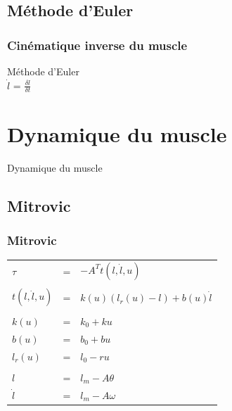 \documentclass{beamer}
\begin{document}
\subsection{Méthode d'Euler}

\begin{frame}
\frametitle{Cinématique inverse du muscle}
Méthode d'Euler\\
$\dot{l}$ = $\frac{\delta l}{\delta t}$ \\
\end{frame}
    

\section{Dynamique du muscle}
\begin{frame}
\begin{center}
{\LARGE Dynamique du muscle}
\end{center}
\end{frame}

\subsection{Mitrovic}

\begin{frame}
\frametitle{Mitrovic}
\begin{tabular}{lcl}
    $\tau$ & = & $-A^T t(l, \dot{l}, u)$ \\
    & & \\
    $t(l, \dot{l}, u)$        & = & $k(u) (l_r(u) - l) + b(u) \dot{l}$ \\
    & & \\
    $k(u)$    & = & $k_0 + k u$ \\
    $b(u)$    & = & $b_0 + b u$ \\
    $l_r(u)$  & = & $l_0 - r u$ \\
    & & \\
    $l$       & = & $l_m - A \theta $ \\
    $\dot{l}$ & = & $l_m - A \omega $ \\
\end{tabular}
\end{frame}
\end{document}
